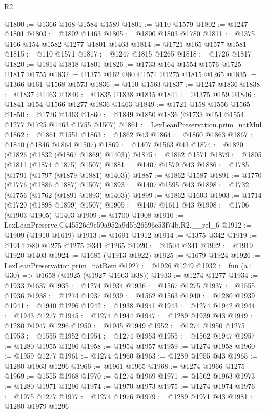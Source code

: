 \begin{lexlean}{R2}
\begin{coremodule}
@1800 := @1366 @168 @1584 @1589
@1801 := @110 @1579
@1802 := @1247 @1801
@1803 := @1802 @1463
@1805 := @1800 @1803 @1780
@1811 := @1375 @166 @154 @1582 @1277 @1801 @1463
@1814 := @1721 @165 @1577 @1581
@1815 := @110 @1571
@1817 := @1247 @1815 @1265
@1818 := @1726 @1817
@1820 := @1814 @1818 @1801
@1826 := @1733 @164 @1554 @1576 @1725 @1817 @1755
@1832 := @1375 @162 @80 @1574 @1275 @1815 @1265
@1835 := @1366 @161 @1568 @1573
@1836 := @110 @1563
@1837 := @1247 @1836
@1838 := @1837 @1463
@1840 := @1835 @1838 @1815
@1841 := @1375 @159
@1846 := @1841 @154 @1566 @1277 @1836 @1463
@1849 := @1721 @158 @1556 @1565
@1850 := @1726 @1463
@1860 := @1849 @1850 @1836 (@1733 @154 @1554 @1277 @1725 @1463 @1755 @1507)
@1861 := LexLeanPreservation.prim_natMul
@1862 := @1861 @1551
@1863 := @1862 @43
@1864 := @1860 @1863
@1867 := @1840 (@1846 @1864 @1507)
@1869 := @1407 @1563 @43
@1874 := @1820 (@1826 (@1832 (@1867 @1869) @1403))
@1875 := @1862 @1571
@1879 := @1805 (@1811 (@1874 @1875) @1507)
@1881 := @1407 @1579 @43
@1886 := @1785 (@1791 (@1797 (@1879 @1881) @1403))
@1887 := @1862 @1587
@1891 := @1770 (@1776 (@1886 @1887) @1507)
@1893 := @1407 @1595 @43
@1898 := @1732 (@1756 (@1762 (@1891 @1893) @1403))
@1899 := @1862 @1603
@1903 := @1714 (@1720 (@1898 @1899) @1507)
@1905 := @1407 @1611 @43
@1908 := @1706 (@1903 @1905) @1403
@1909 := @1700 @1908
@1910 := LexLeanPreserve.C445526d9c59a952a9d5b26596e53f74b.R2.__rel_6
@1912 := @1909 (@1910 @1619)
@1913 := @1691 @1912
@1914 := @1375 @342
@1919 := @1914 @80 @1275 @1275 @341 @1265
@1920 := @1504 @341
@1922 := @1919 @1920 @1403
@1924 := @1685 (@1913 @1922)
@1925 := @1679 @1924
@1926 := LexLeanPreservation.prim_natRem
@1927 := @1926 @1249
@1932 := fun (a : @30) => @1658 (@1925 (@1927 @1663 @38))
@1933 := @1274 @1277
@1934 := @1933 @1637
@1935 := @1274 @1934
@1936 := @1567 @1275
@1937 := @1555 @1936
@1938 := @1274 @1937
@1939 := @1562 @1563
@1940 := @1280 @1939
@1941 := @1940 @1296
@1942 := @1938 @1941
@1943 := @1274 @1942
@1944 := @1943 @1277
@1945 := @1274 @1944
@1947 := @1289 @1939 @43
@1949 := @1280 @1947 @1296
@1950 := @1945 @1949
@1952 := @1274 @1950 @1275
@1953 := @1555 @1952
@1954 := @1274 @1953
@1955 := @1562 @1947
@1957 := @1280 @1955 @1296
@1958 := @1954 @1957
@1959 := @1274 @1958
@1960 := @1959 @1277
@1961 := @1274 @1960
@1963 := @1289 @1955 @43
@1965 := @1280 @1963 @1296
@1966 := @1961 @1965
@1968 := @1274 @1966 @1275
@1969 := @1555 @1968
@1970 := @1274 @1969
@1971 := @1562 @1963
@1973 := @1280 @1971 @1296
@1974 := @1970 @1973
@1975 := @1274 @1974
@1976 := @1975 @1277
@1977 := @1274 @1976
@1979 := @1289 @1971 @43
@1981 := @1280 @1979 @1296

\end{coremodule}
\end{lexlean}
